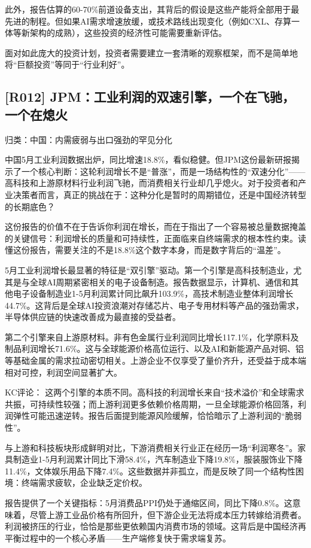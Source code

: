 \documentclass[11pt]{ctexart}
\begin{document}
此外，报告估算的60-70\%前道设备支出，其背后的假设是这些产能将全部用于最先进的制程。但如果AI需求增速放缓，或技术路线出现变化（例如CXL、存算一体等新架构的成熟），这些投资的经济性可能需要重新评估。

面对如此庞大的投资计划，投资者需要建立一套清晰的观察框架，而不是简单地将“巨额投资”等同于“行业利好”。

\subsection{[R012] JPM：工业利润的双速引擎，一个在飞驰，一个在熄火}
{\small\color{refgray}归类：中国：内需疲弱与出口强劲的罕见分化}

中国5月工业利润数据出炉，同比增速18.8\%，看似稳健。但JPM这份最新研报揭示了一个核心判断：这轮利润增长不是“普涨”，而是一场结构性的“双速分化”——高科技和上游原材料行业利润飞驰，而消费相关行业却几乎熄火。对于投资者和产业决策者而言，真正的挑战在于：这种分化是暂时的周期错位，还是中国经济转型的长期底色？

这份报告的价值不在于告诉你利润在增长，而在于指出了一个容易被总量数据掩盖的关键信号：利润增长的质量和可持续性，正面临来自终端需求的根本性约束。读懂这份报告，需要关注的不是18.8\%这个数字本身，而是数字背后的“温差”。

5月工业利润增长最显著的特征是“双引擎”驱动。第一个引擎是高科技制造业，尤其是与全球AI周期紧密相关的电子设备制造。报告数据显示，计算机、通信和其他电子设备制造业1-5月利润累计同比飙升103.9\%，高技术制造业整体利润增长44.7\%。这背后是全球AI投资浪潮对存储芯片、电子专用材料等产品的强劲需求，半导体供应链的快速改善成为最直接的受益者。

第二个引擎来自上游原材料。非有色金属行业利润同比增长117.1\%，化学原料及制品利润增长71.6\%。这与全球能源价格高位运行、以及AI和新能源产品对铜、铝等基础金属的需求拉动密切相关。上游企业不仅享受了量价齐升，还受益于成本端相对可控，利润空间显著扩大。

KC评论： 这两个引擎的本质不同。高科技的利润增长来自“技术溢价”和全球需求共振，可持续性较强；而上游利润更多依赖价格周期，一旦全球能源价格回落，利润弹性可能迅速逆转。报告后面提到能源风险缓解，恰恰暗示了上游利润的“脆弱性”。

与上游和科技板块形成鲜明对比，下游消费相关行业正在经历一场“利润寒冬”。家具制造业1-5月利润累计同比下滑58.4\%，汽车制造业下降19.8\%，服装服饰业下降11.4\%，文体娱乐用品下降7.4\%。这些数据并非孤立，而是反映了同一个结构性困境：终端需求疲软，企业缺乏定价权。

报告提供了一个关键指标：5月消费品PPI仍处于通缩区间，同比下降0.8\%。这意味着，尽管上游工业品价格有所回升，但下游企业无法将成本压力转嫁给消费者。利润被挤压的行业，恰恰是那些更依赖国内消费市场的领域。这背后是中国经济再平衡过程中的一个核心矛盾——生产端修复快于需求端复苏。
\end{document}
